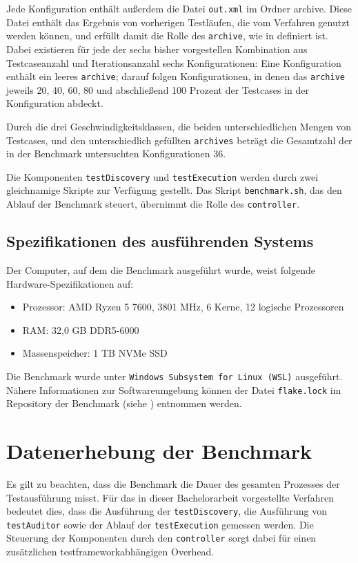 Jede Konfiguration enthält außerdem die Datei \texttt{out.xml} im Ordner archive. Diese Datei enthält das Ergebnis von vorherigen Testläufen, die vom Verfahren genutzt werden können, und erfüllt damit die Rolle des \texttt{archive}, wie in  definiert ist. Dabei existieren für jede der sechs bisher vorgestellen Kombination aus Testcaseanzahl und Iterationsanzahl sechs Konfigurationen: Eine Konfiguration enthält ein leeres \texttt{archive}; darauf folgen Konfigurationen, in denen das \texttt{archive} jeweils 20, 40, 60, 80 und abschließend 100 Prozent der Testcases in der Konfiguration abdeckt.

Durch die drei Geschwindigkeitsklassen, die beiden unterschiedlichen Mengen von Testcases, und den unterschiedlich gefüllten \texttt{archives} beträgt die Gesamtzahl der in der Benchmark untersuchten Konfigurationen 36. 

Die Komponenten \texttt{testDiscovery} und \texttt{testExecution} werden durch zwei gleichnamige Skripte zur Verfügung gestellt. Das Skript \texttt{benchmark.sh}, das den Ablauf der Benchmark steuert, übernimmt die Rolle des \texttt{controller}. 

\subsection{Spezifikationen des ausführenden Systems}
Der Computer, auf dem die Benchmark ausgeführt wurde, weist folgende Hardware-Spezifikationen auf:
\begin{itemize}
    \item Prozessor: AMD Ryzen 5 7600, 3801 MHz, 6 Kerne, 12 logische Prozessoren
    \item RAM: 32,0 GB DDR5-6000
    \item Massenspeicher: 1 TB NVMe SSD
\end{itemize}
Die Benchmark wurde unter \texttt{Windows Subsystem for Linux (WSL)} ausgeführt. Nähere Informationen zur Softwareumgebung können der Datei \texttt{flake.lock} im Repository der Benchmark (siehe ) entnommen werden.

\section{Datenerhebung der Benchmark}
Es gilt zu beachten, dass die Benchmark die Dauer des gesamten Prozesses der Testausführung misst. Für das in dieser Bachelorarbeit vorgestellte Verfahren bedeutet dies, dass die Ausführung der \texttt{testDiscovery}, die Ausführung von \texttt{testAuditor} sowie der Ablauf der \texttt{testExecution} gemessen werden. Die Steuerung der Komponenten durch den \texttt{controller} sorgt dabei für einen zusätzlichen testframeworkabhängigen Overhead. 

